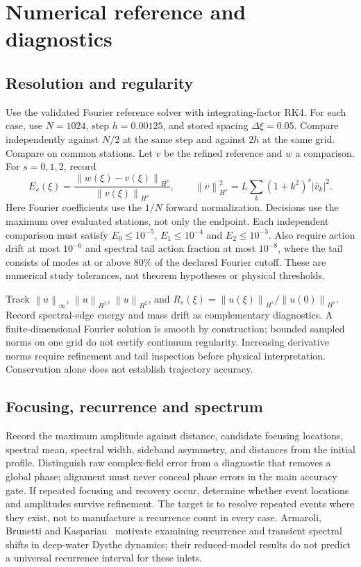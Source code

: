 \documentclass[11pt]{article}
\newcommand{\norm}[1]{\left\lVert #1\right\rVert}
\begin{document}
\section{Numerical reference and diagnostics}

\subsection{Resolution and regularity}

Use the validated Fourier reference solver with integrating-factor RK4.
For each case, use \(N=1024\), step \(h=0.00125\), and stored spacing
\(\Delta\xi=0.05\). Compare independently against \(N/2\) at the same step
and against \(2h\) at the same grid. Compare on common stations. Let \(v\)
be the refined reference and \(w\) a
comparison. For \(s=0,1,2\), record
\[
E_s(\xi)=\frac{\norm{w(\xi)-v(\xi)}_{H^s}}
                       {\norm{v(\xi)}_{H^s}},\qquad
\norm{v}_{H^s}^2=L\sum_k(1+k^2)^s|\widehat v_k|^2.
\]
Here Fourier coefficients use the \(1/N\) forward normalization. Decisions
use the maximum over evaluated stations, not only the endpoint. Each independent
comparison must satisfy \(E_0\leq10^{-5}\), \(E_1\leq10^{-4}\) and
\(E_2\leq10^{-3}\). Also require action drift at most \(10^{-6}\) and spectral
tail action fraction at most \(10^{-8}\), where the tail consists of modes
at or above 80\% of the declared Fourier cutoff. These are numerical study tolerances,
not theorem hypotheses or physical thresholds.

Track \(\norm{u}_\infty\), \(\norm{u}_{H^1}\),
\(\norm{u}_{H^2}\), and
\(R_s(\xi)=\norm{u(\xi)}_{H^s}/\norm{u(0)}_{H^s}\).
Record spectral-edge energy and mass drift as complementary diagnostics.
A finite-dimensional Fourier solution is smooth by construction; bounded
sampled norms on one grid do not certify continuum regularity. Increasing
derivative norms require refinement and tail inspection before physical
interpretation. Conservation alone does not establish trajectory accuracy.

\subsection{Focusing, recurrence and spectrum}

Record the maximum amplitude against distance, candidate focusing locations,
spectral mean, spectral width, sideband asymmetry, and distances from the
initial profile. Distinguish raw complex-field error from a diagnostic that
removes a global phase; alignment must never conceal
phase errors in the main accuracy gate. If repeated focusing and recovery
occur, determine whether event locations and amplitudes survive refinement.
The target is to resolve repeated events where they exist, not to manufacture
a recurrence count in every case. Armaroli, Brunetti and Kasparian~\cite{armaroli}
motivate examining recurrence and transient spectral shifts in deep-water
Dysthe dynamics; their reduced-model results do not predict a universal
recurrence interval for these inlets.
\end{document}
